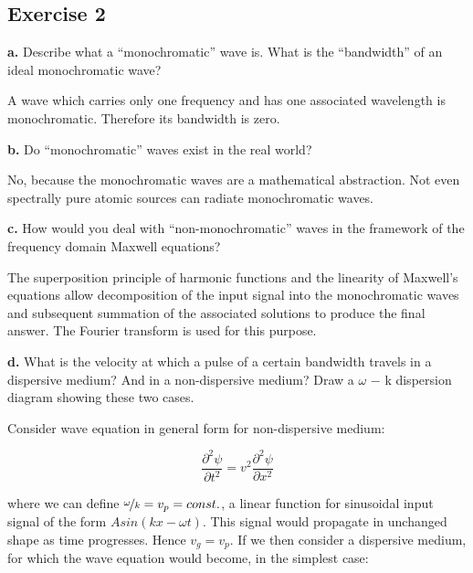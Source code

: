 \documentclass[11pt,a4paper]{article}
\begin{document}
\subsection*{Exercise 2}
\setcounter{equation}{0}
\begin{displayquote}
   \textbf{a.}  Describe what a “monochromatic” wave is. What is the “bandwidth” of an ideal monochromatic wave?
\end{displayquote}

A wave which carries only one frequency and has one associated wavelength is monochromatic. Therefore its bandwidth is zero. 

\begin{displayquote}
    \textbf{b.} Do “monochromatic” waves exist in the real world?
\end{displayquote}

No, because the monochromatic waves are a mathematical abstraction. Not even spectrally pure atomic sources can radiate monochromatic waves.

\begin{displayquote}
    \textbf{c.} How would you deal with “non-monochromatic” waves in the framework of the frequency domain Maxwell equations?
\end{displayquote}
The superposition principle of harmonic functions and the linearity of Maxwell's equations allow decomposition of the input signal into the monochromatic waves and subsequent summation of the associated solutions to produce the final answer. The Fourier transform is used for this purpose.  

\begin{displayquote}
    \textbf{d.} What is the velocity at which a pulse of a certain bandwidth travels in a dispersive medium? And in a non-dispersive medium? Draw a $\omega$ − k dispersion diagram showing these two cases.
\end{displayquote}

Consider wave equation in general form for non-dispersive medium:

\begin{equation}
    \frac{\partial^2{\psi}}{\partial{t^2}}=v^2\frac{\partial^2{\psi}}{\partial{x^2}}
\end{equation}

where we can define $\nicefrac{\omega}{k}=v_p=const.$, a linear function for sinusoidal input signal of the form $A{}sin(kx-\omega{}t)$. This signal would propagate in unchanged shape as time progresses. Hence $v_g=v_p$. If we then consider a dispersive medium, for which the wave equation would become, in the simplest case:
\end{document}
